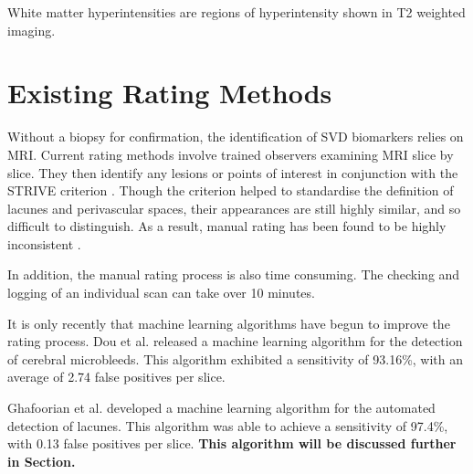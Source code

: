\documentclass[honours,12pt]{unswthesis}
\numberwithin{equation}{section}
\begin{document}
White matter hyperintensities are regions of hyperintensity shown in T2 weighted imaging. 


\section{Existing Rating Methods}\label{svd-rating}

Without a biopsy for confirmation, the identification of SVD biomarkers relies on MRI. Current rating methods involve trained observers examining MRI slice by slice. They then identify any lesions or points of interest in conjunction with the STRIVE criterion \cite{WardlawJ.M.2013Nsfr}. Though the criterion helped to standardise the definition of lacunes and perivascular spaces, their appearances are still highly similar, and so difficult to distinguish. As a result, manual rating has been found to be highly inconsistent \cite{PotterGillian2015CPSV}. 

In addition, the manual rating process is also time consuming. The checking and logging of an individual scan can take over 10 minutes.

It is only recently that machine learning algorithms have begun to improve the rating process. Dou et al. \cite{DouQ.2016ADoC} released a machine learning algorithm for the detection of cerebral microbleeds. This algorithm exhibited a sensitivity of 93.16\%, with an average of 2.74 false positives per slice. 

Ghafoorian et al. \cite{GhafoorianM.2017Dml3} developed a machine learning algorithm for the automated detection of lacunes. This algorithm was able to achieve a sensitivity of 97.4\%, with 0.13 false positives per slice. \textbf{This algorithm will be discussed further in Section.}


\clearpage




\end{document}

